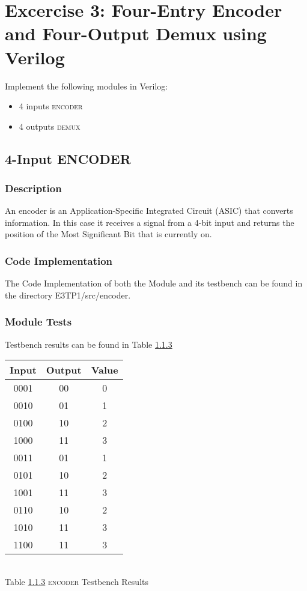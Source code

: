 \section{\color{olive}Excercise 3: Four-Entry Encoder and Four-Output Demux using Verilog}
Implement the following modules in Verilog:
\begin {itemize}
\item 4 inputs \textsc{encoder}
\item 4 outputs \textsc{demux}
\end {itemize}

\subsection{\color{purple}4-Input ENCODER}
\subsubsection{\color{orange}Description}
An encoder is an Application-Specific Integrated Circuit (ASIC) that converts information. In this case it receives a signal from  a 4-bit input and returns the position of the Most Significant Bit that is currently on.
\subsubsection{\color{orange}Code Implementation}
The Code Implementation of both the Module and its testbench can be found in the directory E3TP1/src/encoder.
\subsubsection{\color{orange}Module Tests}
\label{subsec1}
Testbench results can be found in Table \ref{subsec1}
\begin{center}
\begin{tabular}{|c|c|c|}
\hline
Input&Output&Value\\
\hline
0001&00&0\\
0010&01&1\\
0100&10&2\\
1000&11&3\\
0011&01&1\\
0101&10&2\\
1001&11&3\\
0110&10&2\\
1010&11&3\\
1100&11&3\\
\hline
\end{tabular}
\\\vspace{12pt}
Table \ref{subsec1} \textsc{encoder} Testbench Results
\end{center}

